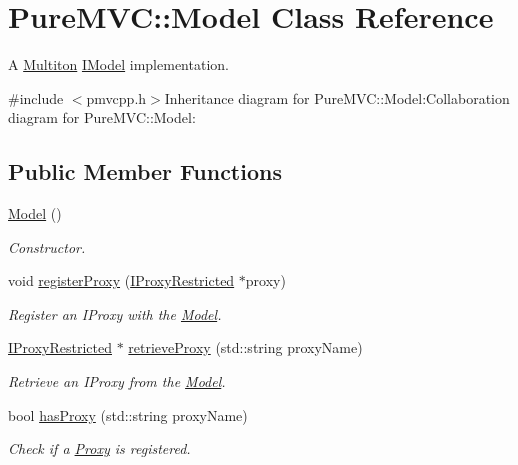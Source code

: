\hypertarget{class_pure_m_v_c_1_1_model}{
\section{PureMVC::Model Class Reference}
\label{class_pure_m_v_c_1_1_model}
}


A \hyperlink{class_pure_m_v_c_1_1_multiton}{Multiton} {\ttfamily \hyperlink{class_pure_m_v_c_1_1_i_model}{IModel}} implementation.  


{\ttfamily \#include $<$pmvcpp.h$>$}Inheritance diagram for PureMVC::Model:Collaboration diagram for PureMVC::Model:\subsection*{Public Member Functions}
\begin{DoxyCompactItemize}
\item 
\hyperlink{class_pure_m_v_c_1_1_model_ae3b375de5f6df4faf74a95d64748e048}{Model} ()
\begin{DoxyCompactList}\small\item\em Constructor. \item\end{DoxyCompactList}\item 
void \hyperlink{class_pure_m_v_c_1_1_model_a12d22c0faf6aa8c69d7b0e3d3cfdd13b}{registerProxy} (\hyperlink{class_pure_m_v_c_1_1_i_proxy_restricted}{IProxyRestricted} $\ast$proxy)
\begin{DoxyCompactList}\small\item\em Register an {\ttfamily IProxy} with the {\ttfamily \hyperlink{class_pure_m_v_c_1_1_model}{Model}}. \item\end{DoxyCompactList}\item 
\hyperlink{class_pure_m_v_c_1_1_i_proxy_restricted}{IProxyRestricted} $\ast$ \hyperlink{class_pure_m_v_c_1_1_model_acba552053974de59cf6bdac940265634}{retrieveProxy} (std::string proxyName)
\begin{DoxyCompactList}\small\item\em Retrieve an {\ttfamily IProxy} from the {\ttfamily \hyperlink{class_pure_m_v_c_1_1_model}{Model}}. \item\end{DoxyCompactList}\item 
bool \hyperlink{class_pure_m_v_c_1_1_model_ae25df8e28fb2d4be29b8217211c7d965}{hasProxy} (std::string proxyName)
\begin{DoxyCompactList}\small\item\em Check if a \hyperlink{class_pure_m_v_c_1_1_proxy}{Proxy} is registered. \item\end{DoxyCompactList}\item 

\end{DoxyCompactItemize}
